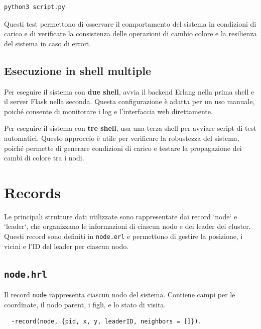 \documentclass[12pt, a4paper]{report}
\begin{document}
\begin{tcolorbox}[title=Esecuzione di test automatici]
\begin{verbatim}
python3 script.py
\end{verbatim}
\end{tcolorbox}

\noindent Questi test permettono di osservare il comportamento del sistema in condizioni di carico e di verificare la consistenza delle operazioni di cambio colore e la resilienza del sistema in caso di errori.

\subsection{Esecuzione in shell multiple}
Per eseguire il sistema con \textbf{due shell}, avvia il backend Erlang nella prima shell e il server Flask nella seconda. Questa configurazione \`e adatta per un uso manuale, poiché consente di monitorare i log e l’interfaccia web direttamente.

Per eseguire il sistema con \textbf{tre shell}, usa una terza shell per avviare script di test automatici. Questo approccio \`e utile per verificare la robustezza del sistema, poiché permette di generare condizioni di carico e testare la propagazione dei cambi di colore tra i nodi.

\section{Records}

Le principali strutture dati utilizzate sono rappresentate dai record `node` e `leader`, che organizzano le informazioni di ciascun nodo e dei leader dei cluster. Questi record sono definiti in \texttt{node.erl} e permettono di gestire la posizione, i vicini e l'ID del leader per ciascun nodo.

\subsection{\texttt{node.hrl}}

Il record \texttt{node} rappresenta ciascun nodo del sistema. Contiene campi per le coordinate, il nodo parent, i figli, e lo stato di visita.

\begin{tcolorbox}[title=Definizione del record \texttt{node}]
\begin{verbatim}
  -record(node, {pid, x, y, leaderID, neighbors = []}).
\end{verbatim}
\end{tcolorbox}
\end{document}
